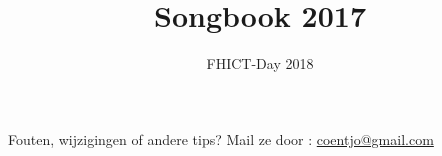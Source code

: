 \documentclass[a4,openany,portrait,tikz]{article}
\title{Songbook 2017}
\author{FHICT-Day 2018}
\begin{document}

  \maketitle











Fouten, wijzigingen of andere tips? Mail ze door :   \href{mailto:coentjo@gmail.com}{coentjo@gmail.com}





%
\end{document}
